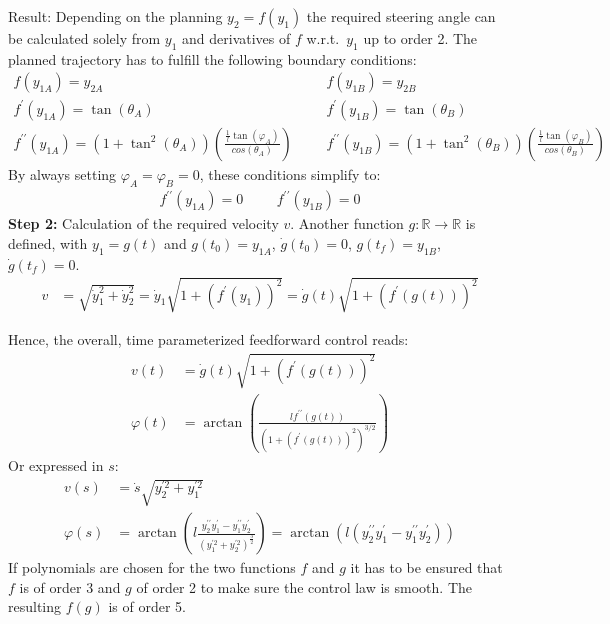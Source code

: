 \documentclass[a4paper,11pt,headings=standardclasses,parskip=half]{scrartcl}
\newcommand{\yIZ}{y_{1A}}
\newcommand{\yIIZ}{y_{2A}}
\newcommand{\yIT}{y_{1B}}
\newcommand{\yIIT}{y_{2B}}
\begin{document}
Result: Depending on the planning $y_2 = f(y_1)$ the required steering angle can be calculated solely from $y_1$ and derivatives of $f$ w.r.t.~$y_1$ up to order 2. The planned trajectory has to fulfill the following boundary conditions:
\begin{align*}
f(\yIZ) = \yIIZ &&& f(\yIT) = \yIIT \\
f^\prime(\yIZ) = \tan(\theta_A) &&& f^\prime(\yIT) = \tan(\theta_B) \\
f^{\prime\prime}(\yIZ) = (1+\tan^2(\theta_A))\left(\frac{\frac{1}{l}\tan(\varphi_A)}{cos(\theta_A)}\right) &&& 
f^{\prime\prime}(\yIT) = (1+\tan^2(\theta_B))\left(\frac{\frac{1}{l}\tan(\varphi_B)}{cos(\theta_B)}\right) 
\end{align*}
By always setting $\varphi_A=\varphi_B=0$, these conditions simplify to:
\begin{align*}
f^{\prime\prime}(\yIZ) = 0 &&& f^{\prime\prime}(\yIT) = 0
\end{align*}
\textbf{Step 2:} Calculation of the required velocity $v$. Another function $g: \mathbb{R} \to \mathbb{R}$ is defined, with $y_1 = g(t)$ and $g(t_0) = \yIZ$, $\dot g(t_0) = 0$, $g(t_f) = \yIT$, $\dot g(t_f) = 0$. 
\begin{align}
v &= \sqrt{\dot y_1^2 + \dot y_2^2} = \dot y_1\sqrt{1 + (f^\prime(y_1))^2} = \dot g(t) \sqrt{1 + (f^\prime(g(t)))^2}
\end{align}

Hence, the overall, time parameterized feedforward control reads:
\begin{subequations}
\label{eq:controllaw}
\begin{align}
v(t) &= \dot g(t) \sqrt{1 + (f^\prime(g(t)))^2}\\
\varphi(t) &= \arctan\left(\frac{lf^{\prime\prime}(g(t))}{\left(1 + (f^\prime(g(t)))^2\right)^{3/2}}\right)
\end{align}
\end{subequations}
Or expressed in $s$:
\begin{subequations}
\label{eq:controllaw_2}
\begin{align}
v(s) &= \dot{s} \sqrt{y_2^{\prime2}+y_1^{\prime2}}\\
\varphi(s) &= \arctan\left(l \frac{y_2^{\prime\prime}y_1^\prime-y_1^{\prime\prime}y_2^\prime}{(y_1^{\prime2}+y_2^{\prime2})^{\frac{3}{2}}}\right) = \arctan\left(l (y_2^{\prime\prime}y_1^\prime-y_1^{\prime\prime}y_2^\prime)\right)
\end{align}
\end{subequations}
If polynomials are chosen for the two functions $f$ and $g$ it has to be ensured that $f$ is of order 3 and $g$ of order 2 to make sure the control law is smooth. The resulting $f(g)$ is of order 5.
\end{document}
